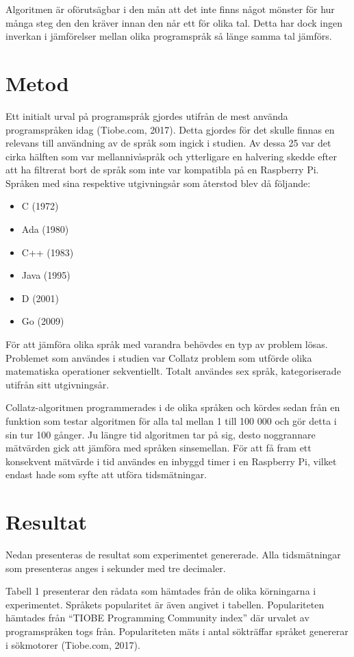 \documentclass[12pt,swedish]{article}
\begin{document}
Algoritmen är oförutsägbar i den mån att det inte finns något mönster för hur många steg den den kräver innan den når ett för olika tal. Detta har dock ingen inverkan i jämförelser mellan olika programspråk så länge samma tal jämförs.

\section{Metod}
Ett initialt urval på programspråk gjordes utifrån de mest använda programspråken idag (Tiobe.com, 2017). Detta gjordes för det skulle finnas en relevans till användning av de språk som ingick i studien. Av dessa 25 var det cirka hälften som var mellannivåspråk och ytterligare en halvering skedde efter att ha filtrerat bort de språk som inte var kompatibla på en Raspberry Pi. Språken med sina respektive utgivningsår som återstod blev då följande:

\begin{itemize}
    \item C (1972)
    \item Ada (1980)
    \item C++ (1983)
    \item Java (1995)
    \item D (2001)
    \item Go (2009)
\end{itemize}
För att jämföra olika språk med varandra behövdes en typ av problem lösas. Problemet som användes i studien var Collatz problem som utförde olika matematiska operationer sekventiellt. Totalt användes sex språk, kategoriserade utifrån sitt utgivningsår.

Collatz-algoritmen programmerades i de olika språken och kördes sedan från en funktion som testar algoritmen för alla tal mellan 1 till 100 000 och gör detta i sin tur 100 gånger. Ju längre tid algoritmen tar på sig, desto noggrannare mätvärden gick att jämföra med språken sinsemellan. För att få fram ett konsekvent mätvärde i tid användes en inbyggd timer i en Raspberry Pi, vilket endast hade som syfte att utföra tidsmätningar.


\section{Resultat}
Nedan presenteras de resultat som experimentet genererade. Alla tidsmätningar som presenteras anges i sekunder med tre decimaler.

Tabell 1 presenterar den rådata som hämtades från de olika körningarna i experimentet. Språkets popularitet är även angivet i tabellen. Populariteten hämtades från “TIOBE Programming Community index” där urvalet av programspråken togs från. Populariteten mäts i antal sökträffar språket genererar i sökmotorer (Tiobe.com, 2017).
\end{document}
